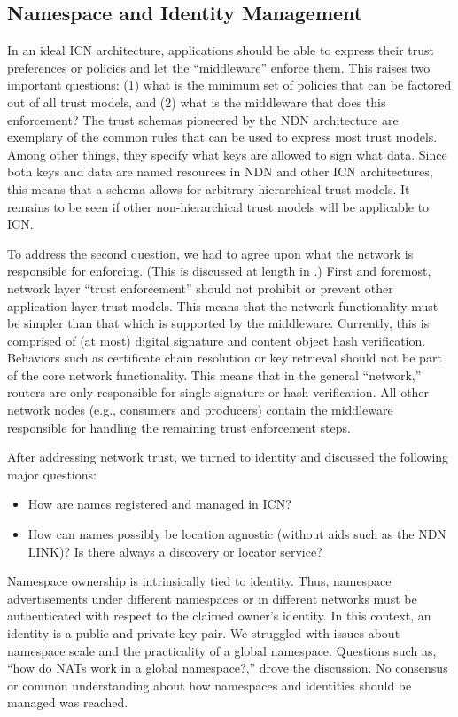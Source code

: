 \subsection{Namespace and Identity Management}
In an ideal ICN architecture, applications should be able to express their trust preferences or policies and let the ``middleware'' enforce them. This raises two important questions: (1) what is the minimum set of policies that can be factored out of all trust models, and (2) what is the middleware that does this enforcement? The trust schemas pioneered by the NDN architecture \cite{schemas} are exemplary of the common rules that can be used to express most trust models. Among other things, they specify what keys are allowed to sign what data. Since both keys and data are named resources in NDN and other ICN architectures, this means that a schema allows for arbitrary hierarchical trust models. It remains to be seen if other non-hierarchical trust models will be applicable to ICN.

To address the second question, we had to agree upon what the network is responsible for enforcing. (This is discussed at length in \cite{trust}.)
First and foremost, network layer ``trust enforcement'' should not prohibit or prevent other application-layer trust models. This means that the network functionality must be simpler than that which is supported by the middleware. Currently, this is comprised of (at most) digital signature and content object hash verification. Behaviors such as certificate chain resolution or key retrieval should not be part of the core network functionality. This means that in the general ``network,'' routers are only responsible for single signature or hash verification. All other network nodes (e.g., consumers and producers) contain the middleware responsible for handling the remaining trust enforcement steps.

After addressing network trust, we turned to identity and discussed the following major questions:
%
\begin{itemize}
\item How are names registered and managed in ICN?
\item How can names possibly be location agnostic (without aids such as the NDN LINK)? Is there always a discovery or locator service?
\end{itemize}
%
Namespace ownership is intrinsically tied to identity. Thus, namespace advertisements under different namespaces or in different networks must be authenticated with respect to the claimed owner's identity. In this context, an identity is a public and private key pair. We struggled with issues about namespace scale and the practicality of a global namespace. Questions such as, ``how do NATs work in a global namespace?,'' drove the discussion. No consensus or common understanding about how namespaces and identities should be managed was reached.


